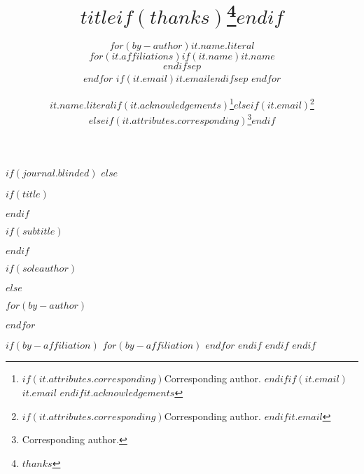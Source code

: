 $if(journal.blinded)$
$else$

  $if(title)$\title{$title$$if(thanks)$\thanks{$thanks$}$endif$}$endif$
  
  $if(subtitle)$
    \usepackage{etoolbox}
    \makeatletter
      \providecommand{\subtitle}[1]{\apptocmd{\@title}{\par {\large #1 \par}}{}{}}
    \makeatother
    
    \subtitle{$subtitle$}
  $endif$
  
  $if(soleauthor)$
    \author{$for(by-author)$$it.name.literal$ \\ $for(it.affiliations)$$if(it.name)$$it.name$ \\$endif$$sep$ \\$endfor$ $if(it.email)$$it.email$$endif$$sep$ $endfor$}
  $else$
    \setlength{\affilsep}{1em}
    
    $for(by-author)$
      \author[$if(it.affiliations)$$for(it.affiliations)$$it.number$$sep$,$endfor$$endif$]{$it.name.literal$$if(it.acknowledgements)$\thanks{$if(it.attributes.corresponding)$Corresponding author. $endif$$if(it.email)$$it.email$ $endif$$it.acknowledgements$}$elseif(it.email)$\thanks{$if(it.attributes.corresponding)$Corresponding author. $endif$$it.email$}$elseif(it.attributes.corresponding)$\thanks{Corresponding author.}$endif$}
    $endfor$
    
    $if(by-affiliation)$
      $for(by-affiliation)$
      $endfor$
    $endif$
  $endif$
$endif$

